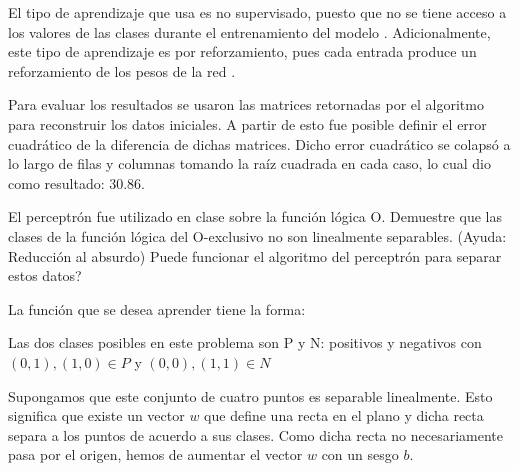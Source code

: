 \documentclass[11pt,spanish,answers]{exam}
\begin{document}
\begin{questions}
\begin{solution}
    El tipo de aprendizaje que usa es no supervisado, puesto que no se tiene acceso a los valores de las clases durante el entrenamiento del modelo \cite{aprendizajeNoSupervisado}. Adicionalmente, este tipo de aprendizaje es por reforzamiento, pues cada entrada produce un reforzamiento de los pesos de la red \cite{competitivo_vs_reforzamiento}. 
    
    Para evaluar los resultados se usaron las matrices retornadas por el algoritmo para reconstruir los datos iniciales. A partir de esto fue posible definir el error cuadrático de la diferencia de dichas matrices. Dicho error cuadrático se colapsó a lo largo de filas y columnas tomando la raíz cuadrada en cada caso, lo cual dio como resultado: 30.86.
    
    \end{solution}

\question
El perceptrón fue utilizado en clase sobre la función lógica O. Demuestre que las clases de la función lógica del O-exclusivo no son linealmente separables. (Ayuda: Reducción al absurdo) Puede funcionar el algoritmo del perceptrón para separar estos datos?

    \begin{solution}
    
    La función que se desea aprender tiene la forma:
    
    \begin{center}
    \end{center}

    Las dos clases posibles en este problema son P y N: positivos y negativos con $ (0,1),(1,0) \in P $ y $ (0,0),(1,1) \in N $
    
    Supongamos que este conjunto de cuatro puntos es separable linealmente. Esto significa que existe un vector $ w $ que define una recta en el plano y dicha recta separa a los puntos de acuerdo a sus clases. Como dicha recta no necesariamente pasa por el origen, hemos de aumentar el vector $ w $ con un sesgo $ b $.
    

\end{solution}
\end{questions}
\end{document}
